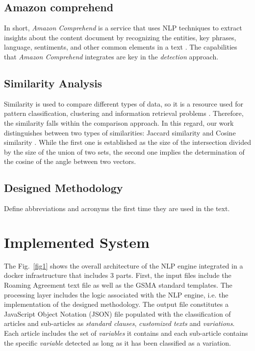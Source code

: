 \documentclass[conference]{style/IEEEtran}
\begin{document}
\subsection{Amazon comprehend}
In short, \textit{Amazon Comprehend} is a service that uses NLP techniques to extract insights about the content document by recognizing  the  entities,  key  phrases,  language,  sentiments,  and  other  common  elements  in  a  text \cite{AWS2021}. The capabilities that \textit{Amazon Comprehend} integrates are key in the \textit{detection} approach.

\subsection{Similarity Analysis}
Similarity is used to compare different types of data, so it is a resource used for pattern classification, clustering and information retrieval problems \cite{7429408}. Therefore, the similarity falls within the comparison approach. In this regard, our work distinguishes between two types of similarities: Jaccard similarity and Cosine similarity \cite{Gupta2018}. While the first one is established as the size of the intersection divided by the size of the union of two sets, the second one implies the determination of the cosine of the angle between two vectors.

\subsection{Designed Methodology}
Define abbreviations and acronyms the first time they are used in the text.

\section{Implemented System}
The Fig.~\ref{fig1} shows the overall architecture of the NLP engine integrated in a docker infrastructure that includes 3 parts. First, the input files include the Roaming Agreement text file as well as the GSMA standard templates. The processing layer includes the logic associated with the NLP engine, i.e. the implementation of the designed methodology. The output file constitutes a JavaScript Object Notation (JSON) file populated with the classification of articles and sub-articles as \textit{standard clauses}, \textit{customized texts} and \textit{variations}. Each article includes the set of \textit{variables} it contains and each sub-article contains the specific \textit{variable} detected as long as it has been classified as a variation.
\end{document}

